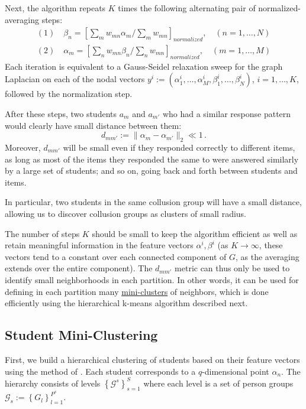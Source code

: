 \documentclass{article}
\newcommand{\cG}{\mathcal{G}}
\begin{document}
Next, the algorithm repeats $K$ times the following alternating pair of normalized-averaging steps:
\begin{equation}
\begin{split}
(1) \quad \beta_n = \left[ \sum_m w_{mn} \alpha_m / \sum_m w_{mn} \right]_{normalized}, \quad (n=1,\ldots,N) \\
(2) \quad \alpha_m = \left[ \sum_n w_{mn} \beta_n / \sum_n w_{mn} \right]_{normalized}, \quad (m=1,\ldots,M) 
\end{split}
\label{eqn:bistep}
\end{equation}
Each iteration is equivalent to a Gauss-Seidel relaxation sweep for the graph Laplacian \cite{lamg} on each of the nodal vectors $y^i := (\alpha_1^i,\dots,\alpha_M^i,\beta_1^i,\dots,\beta_N^i)$, $i=1,\dots,K$, followed by the normalization step.

After these steps, two students $a_m$ and $a_{m'}$ who had a similar response pattern would clearly have small distance between them:
\begin{equation}
d_{mm'} := \|\alpha_m - \alpha_{m'} \|_2 \ll 1\,.
\end{equation}
Moreover, $d_{mm'}$ will be small even if they responded correctly to different items, as long as most of the items they responded the same to were answered similarly by a large set of students; and so on, going back and forth between students and items.

In particular, two students in the same collusion group will have a small distance, allowing us to discover collusion groups as clusters of small radius.

The number of steps $K$ should be small to keep the algorithm efficient as well as retain meaningful information in the feature vectors $\alpha^i, \beta^i$ (as $K \rightarrow \infty$, these vectors tend to a constant over each connected component of $G$, as the averaging extends over the entire component). The $d_{mm'}$ metric can thus only be used to identify small neighborhoods in each partition. In other words, it can be used for defining in each partition many \underline{mini-clusters} of neighbors, which is done efficiently using the hierarchical k-means algorithm described next.

\subsection{Student Mini-Clustering}
\label{miniclustering}
First, we build a hierarchical clustering of students based on their feature vectors using the method of \cite{miniclustering}. Each student corresponds to a $q$-dimensional point $\alpha_n$. The hierarchy consists of levels $\left\{\cG^s\right\}_{s=1}^S$ where each level is a set of person groups $\cG_s := \left\{G_l\right\}_{l=1}^{P^s}$.
\end{document}

